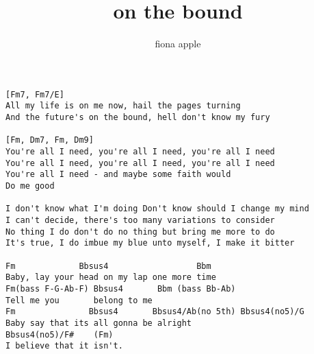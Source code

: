 \author{fiona apple}
\title{on the bound}
\maketitle
\begin{verbatim}
[Fm7, Fm7/E]
All my life is on me now, hail the pages turning 
And the future's on the bound, hell don't know my fury 

[Fm, Dm7, Fm, Dm9]
You're all I need, you're all I need, you're all I need 
You're all I need, you're all I need, you're all I need 
You're all I need - and maybe some faith would 
Do me good 

I don't know what I'm doing Don't know should I change my mind
I can't decide, there's too many variations to consider
No thing I do don't do no thing but bring me more to do 
It's true, I do imbue my blue unto myself, I make it bitter

Fm             Bbsus4                  Bbm
Baby, lay your head on my lap one more time
Fm(bass F-G-Ab-F) Bbsus4       Bbm (bass Bb-Ab)
Tell me you       belong to me
Fm               Bbsus4       Bbsus4/Ab(no 5th) Bbsus4(no5)/G
Baby say that its all gonna be alright
Bbsus4(no5)/F#    (Fm)
I believe that it isn't.
\end{verbatim}